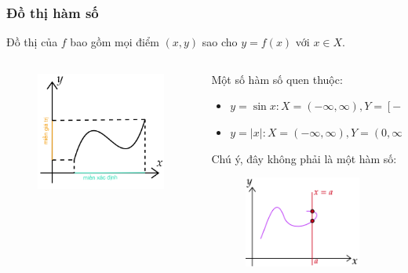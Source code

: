 \begin{frame}
\frametitle{Đồ thị hàm số}
   Đồ thị của \(f\) bao gồm mọi điểm \((x,y)\) sao cho \(y=f(x)\) với \(x\in X\).
  \begin{columns}
    \begin{column}{0.5\textwidth}
      \begin{figure}
        \centering
        \includegraphics[width=5cm, height= 4cm]{Slides/figure/hamso1 - Copy.png}
      \end{figure}
    \end{column}
    \begin{column}{0.5\textwidth}
      Một số hàm số quen thuộc:
      \begin{itemize}
        \item \(y=\sin x : X= (-\infty, \infty), Y=[-1,1]\)
        \item \(y=\lvert x\rvert : X= (-\infty, \infty), Y=(0,\infty)\)
      \end{itemize}
      Chú ý, đây không phải là một hàm số:
    \begin{figure}
        \centering
        \includegraphics[width=4cm, height= 3cm]{Slides/figure/khongphaihamso - Copy.png}
      \end{figure}
    \end{column}
  \end{columns}
\end{frame}
    